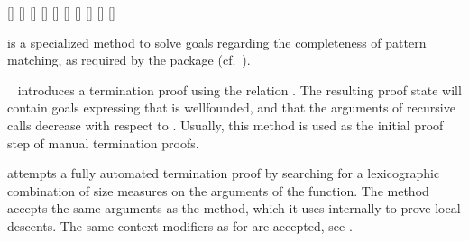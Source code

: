 \begin{isabellebody}
\begin{isamarkuptext}
  \begin{railoutput}
[]
[]
\rail@end
{}
[]
\rail@plus
{}
[]
\rail@endplus
\rail@end
{}
[]
[]
\rail@plus
{}
[]
\rail@endplus
\rail@end
{}
\rail@plus
{}
\rail@bar
{}[]
[]
[]
\rail@endbar
\rail@endplus
\rail@end
\end{railoutput}


  \begin{description}

  \item \hyperlink{method.HOL.pat-completeness}{\mbox{}} is a specialized method to
  solve goals regarding the completeness of pattern matching, as
  required by the \hyperlink{command.HOL.function}{\mbox{}} package (cf.\
  \cite{isabelle-function}).

  \item \hyperlink{method.HOL.relation}{\mbox{}}~ introduces a termination
  proof using the relation .  The resulting proof state will
  contain goals expressing that  is wellfounded, and that the
  arguments of recursive calls decrease with respect to \isa{R}.
  Usually, this method is used as the initial proof step of manual
  termination proofs.

  \item \hyperlink{method.HOL.lexicographic-order}{\mbox{}} attempts a fully
  automated termination proof by searching for a lexicographic
  combination of size measures on the arguments of the function. The
  method accepts the same arguments as the \hyperlink{method.auto}{\mbox{}} method,
  which it uses internally to prove local descents.  The same context
  modifiers as for \hyperlink{method.auto}{\mbox{\isa{auto}}} are accepted, see
  \secref{sec:clasimp}.


\end{description}
\end{isamarkuptext}
\end{isabellebody}
